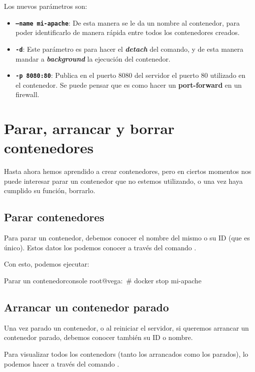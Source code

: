Los nuevos parámetros son:
\begin{itemize}
    \item \textbf{\texttt{--name mi-apache}}: De esta manera se le da un nombre al contenedor, para poder identificarlo de manera rápida entre todos los contenedores creados.
    \item \textbf{\texttt{-d}}: Este parámetro es para hacer el \textbf{\textit{detach}} del comando, y de esta manera mandar a \textbf{\textit{background}} la ejecución del contenedor.
    \item \textbf{\texttt{-p 8080:80}}: Publica en el puerto 8080 del servidor el puerto 80 utilizado en el contenedor. Se puede pensar que es como hacer un \textbf{port-forward} en un firewall.
\end{itemize}

\section{Parar, arrancar y borrar contenedores}

Hasta ahora hemos aprendido a crear contenedores, pero en ciertos momentos nos puede interesar parar un contenedor que no estemos utilizando, o una vez haya cumplido su función, borrarlo.

\subsection{Parar contenedores}

Para parar un contenedor, debemos conocer el nombre del mismo o su ID (que es único). Estos datos los podemos conocer a través del comando  .

Con esto, podemos ejecutar:

\begin{mycode}{Parar un contenedor}{console}{{\small }}
root@vega:~# docker stop mi-apache
\end{mycode}

\subsection{Arrancar un contenedor parado}

Una vez parado un contenedor, o al reiniciar el servidor, si queremos arrancar un contenedor parado, debemos conocer también su ID o nombre.

Para visualizar todos los contenedors (tanto los arrancados como los parados), lo podemos hacer a través del comando .

